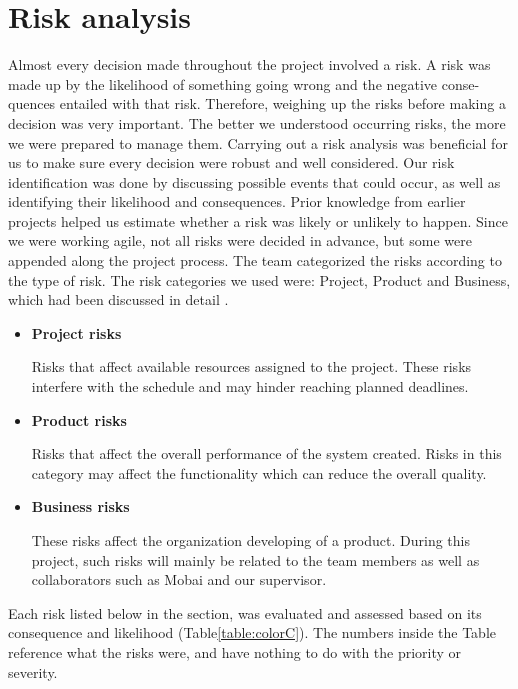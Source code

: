 \section{Risk analysis} 
Almost every decision made throughout the project involved a risk. A risk was made up by the likelihood of something going wrong and the negative conse-quences entailed with that risk. Therefore, weighing up the risks before making a decision was very important. The better we understood occurring risks, the more we were prepared to manage them. Carrying out a risk analysis was beneficial for us to make sure every decision were robust and well considered. Our risk identification was done by discussing possible events that could occur, as well as identifying their likelihood and consequences. Prior knowledge from earlier projects helped us estimate whether a risk was likely or unlikely to happen. Since we were working agile, not all risks were decided in advance, but some were appended along the project process. The team categorized the risks according to the type of risk. The risk categories we used were: Project, Product and Business, which had been discussed in  detail \cite{RiskAnalysis}. 

\begin{itemize}
    \item \textbf{Project risks} 
        \par \hspace{0,5cm} Risks that affect available resources assigned to the project. These risks interfere with the schedule and may hinder reaching planned deadlines. 
    \item \textbf{Product risks} 
        \par \hspace{0,5cm} Risks that affect the overall performance of the system created. Risks in this category may affect the functionality which can reduce the overall quality. 
    \item \textbf{Business risks}
        \par \hspace{0,5cm} These risks affect the organization developing of a product. During this project, such risks will mainly be related to the team members as well as collaborators such as Mobai and our supervisor. 
\end{itemize}

Each risk listed below in the section, was evaluated and assessed based on its consequence and likelihood (Table\ref{table:colorC}). The numbers inside the Table reference what the risks were, and have nothing to do with the priority or severity. 
    
